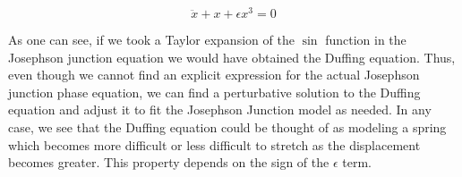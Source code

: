 \documentclass[12pt]{article}
\begin{document}
\begin{equation}
\ddot{x} + x + \epsilon x^3 = 0
\end{equation}

As one can see, if we took a Taylor expansion of the $\sin$ function in the Josephson junction equation we would have obtained the Duffing equation.  Thus, even though we cannot find an explicit expression for the actual Josephson junction phase equation, we can find a perturbative solution to the Duffing equation and adjust it to fit the Josephson Junction model as needed.  In any case, we see that the Duffing equation could be thought of as modeling a spring which becomes more difficult or less difficult to stretch as the displacement becomes greater.  This property depends on the sign of the $\epsilon$ term.
\end{document}
